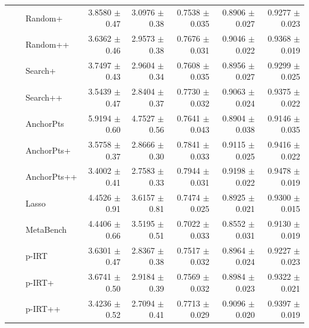 \begin{longtable}{llp{}rrrrr}
 &  & Random+ & 3.8580 {\scriptsize $\pm$ 0.47} & 3.0976 {\scriptsize $\pm$ 0.38} & 0.7538 {\scriptsize $\pm$ 0.035} & 0.8906 {\scriptsize $\pm$ 0.027} & 0.9277 {\scriptsize $\pm$ 0.023} \\
 &  & Random++ & 3.6362 {\scriptsize $\pm$ 0.46} & 2.9573 {\scriptsize $\pm$ 0.38} & 0.7676 {\scriptsize $\pm$ 0.031} & 0.9046 {\scriptsize $\pm$ 0.022} & 0.9368 {\scriptsize $\pm$ 0.019} \\
 &  & Search+ & 3.7497 {\scriptsize $\pm$ 0.43} & 2.9604 {\scriptsize $\pm$ 0.34} & 0.7608 {\scriptsize $\pm$ 0.035} & 0.8956 {\scriptsize $\pm$ 0.027} & 0.9299 {\scriptsize $\pm$ 0.025} \\
 &  & Search++ & 3.5439 {\scriptsize $\pm$ 0.47} & 2.8404 {\scriptsize $\pm$ 0.37} & 0.7730 {\scriptsize $\pm$ 0.032} & 0.9063 {\scriptsize $\pm$ 0.024} & 0.9375 {\scriptsize $\pm$ 0.022} \\
 &  & AnchorPts & 5.9194 {\scriptsize $\pm$ 0.60} & 4.7527 {\scriptsize $\pm$ 0.56} & 0.7641 {\scriptsize $\pm$ 0.043} & 0.8904 {\scriptsize $\pm$ 0.038} & 0.9146 {\scriptsize $\pm$ 0.035} \\
 &  & AnchorPts+ & 3.5758 {\scriptsize $\pm$ 0.37} & 2.8666 {\scriptsize $\pm$ 0.30} & 0.7841 {\scriptsize $\pm$ 0.033} & 0.9115 {\scriptsize $\pm$ 0.025} & 0.9416 {\scriptsize $\pm$ 0.022} \\
 &  & AnchorPts++ & 3.4002 {\scriptsize $\pm$ 0.41} & 2.7583 {\scriptsize $\pm$ 0.33} & 0.7944 {\scriptsize $\pm$ 0.031} & 0.9198 {\scriptsize $\pm$ 0.022} & 0.9478 {\scriptsize $\pm$ 0.019} \\
 &  & Lasso & 4.4526 {\scriptsize $\pm$ 0.91} & 3.6157 {\scriptsize $\pm$ 0.81} & 0.7474 {\scriptsize $\pm$ 0.025} & 0.8925 {\scriptsize $\pm$ 0.021} & 0.9300 {\scriptsize $\pm$ 0.015} \\
 &  & MetaBench & 4.4406 {\scriptsize $\pm$ 0.66} & 3.5195 {\scriptsize $\pm$ 0.51} & 0.7022 {\scriptsize $\pm$ 0.033} & 0.8552 {\scriptsize $\pm$ 0.031} & 0.9130 {\scriptsize $\pm$ 0.019} \\
 &  & p-IRT & 3.6301 {\scriptsize $\pm$ 0.47} & 2.8367 {\scriptsize $\pm$ 0.38} & 0.7517 {\scriptsize $\pm$ 0.032} & 0.8964 {\scriptsize $\pm$ 0.024} & 0.9227 {\scriptsize $\pm$ 0.023} \\
 &  & p-IRT+ & 3.6741 {\scriptsize $\pm$ 0.50} & 2.9184 {\scriptsize $\pm$ 0.39} & 0.7569 {\scriptsize $\pm$ 0.032} & 0.8984 {\scriptsize $\pm$ 0.023} & 0.9322 {\scriptsize $\pm$ 0.021} \\
 &  & p-IRT++ & 3.4236 {\scriptsize $\pm$ 0.52} & 2.7094 {\scriptsize $\pm$ 0.41} & 0.7713 {\scriptsize $\pm$ 0.029} & 0.9096 {\scriptsize $\pm$ 0.020} & 0.9397 {\scriptsize $\pm$ 0.019} \\

\end{longtable}
